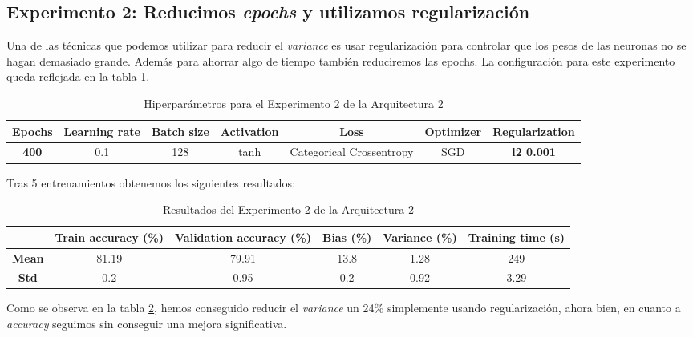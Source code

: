 \documentclass{article}
\begin{document}
			\newpage
			
			
		\subsection{Experimento 2: Reducimos \textit{epochs} y utilizamos regularizaci\'on}
		\label{s-a2-e2}
			Una de las t\'ecnicas que podemos utilizar para reducir el \textit{variance} es usar regularizaci\'on para controlar que los pesos de las neuronas no se hagan demasiado grande. Adem\'as para ahorrar algo de tiempo tambi\'en reduciremos las epochs. La configuraci\'on para este experimento queda reflejada en la tabla \ref{tab:hip-a2-e2}.
			\begin{table}[!h]
				\begin{center}
					\begin{tabular}{| c | c | c | c | c | c | c |}
						\textbf{Epochs} & \textbf{Learning rate} & \textbf{Batch size} & \textbf{Activation} & \textbf{Loss} & \textbf{Optimizer} & \textbf{Regularization} \\ \hline
						\textbf{400} & 0.1 & 128 & tanh & Categorical Crossentropy & SGD & \textbf{l2 0.001}
					\end{tabular}
					\caption{Hiperpar\'ametros para el Experimento 2 de la Arquitectura 2}
					\label{tab:hip-a2-e2}
				\end{center}
			\end{table}
			
			Tras 5 entrenamientos obtenemos los siguientes resultados:
			
			\begin{table}[!h]
				\begin{center}
					\begin{tabular}{ c | c | c | c | c | c |}
						\ & \textbf{Train accuracy (\%)} & \textbf{Validation accuracy (\%)} & \textbf{Bias (\%)} & \textbf{Variance (\%)} & \textbf{Training time (s)} \\ \hline
						\textbf{Mean} & 81.19 & 79.91 & 13.8 & 1.28 & 249\\ \hline
						\textbf{Std} & 0.2 & 0.95 & 0.2 & 0.92 & 3.29 \\ \hline
					\end{tabular}
					\caption{Resultados del Experimento 2 de la Arquitectura 2}
					\label{tab:res-a2-e2}
				\end{center}
			\end{table}
			
			Como se observa en la tabla \ref{tab:res-a2-e2}, hemos conseguido reducir el \textit{variance} un 24\% simplemente usando regularizaci\'on, ahora bien, en cuanto a \textit{accuracy} seguimos sin conseguir una mejora significativa.
			
\end{document}
